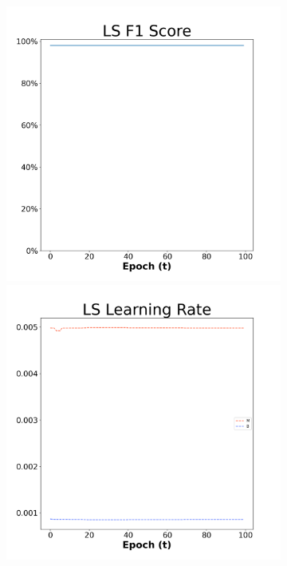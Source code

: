 \begin{figure}[H]
    \centering %
\begin{subfigure}{0.3\textwidth}
  \includegraphics[width=\linewidth]{images/exper2/breast/LS_0.01_f1.png}
    \includegraphics[width=\linewidth]{images/exper2/breast/LS_0.01_lr.png}

\end{subfigure}
\end{figure}
